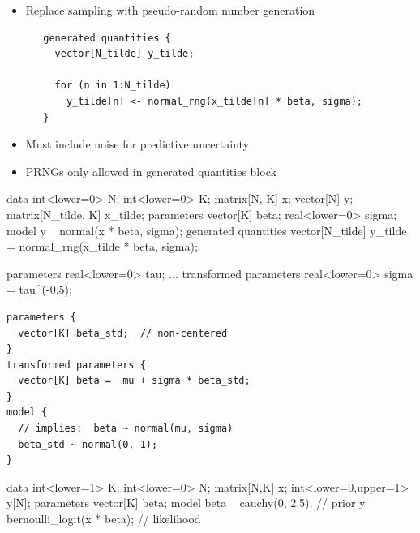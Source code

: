 \documentclass[10pt]{report}
\begin{document}
%
\begin{itemize}
\item Replace sampling with pseudo-random number generation
{\footnotesize
\begin{Verbatim}
   generated quantities {
     vector[N_tilde] y_tilde;

     for (n in 1:N_tilde) 
       y_tilde[n] <- normal_rng(x_tilde[n] * beta, sigma);
   }
\end{Verbatim}
}
\item Must include noise for predictive uncertainty
\item PRNGs only allowed in generated quantities block
\end{itemize}


%
\begin{stancode}
data {
  int<lower=0> N;               int<lower=0> K;
  matrix[N, K] x;               vector[N] y;
  matrix[N_tilde, K] x_tilde;
}
parameters {
  vector[K] beta;               real<lower=0> sigma;
}
model {
  y ~ normal(x * beta, sigma);
}
generated quantities {
  vector[N_tilde] y_tilde
    = normal_rng(x_tilde * beta, sigma);
}
\end{stancode}


%
\begin{stancode}
    parameters {
      real<lower=0> tau;
      ...
    }
    transformed parameters {
      real<lower=0> sigma = tau^(-0.5);
    }
\end{stancode}


{\small
\begin{Verbatim}
parameters {
  vector[K] beta_std;  // non-centered
}
transformed parameters {
  vector[K] beta =  mu + sigma * beta_std;
}
model {
  // implies:  beta ~ normal(mu, sigma)
  beta_std ~ normal(0, 1);
}
\end{Verbatim}
}


%
\begin{stancode}
     data {
       int<lower=1> K;
       int<lower=0> N;
       matrix[N,K] x;
       int<lower=0,upper=1> y[N];
     }
     parameters {
       vector[K] beta;
     }
     model {
        beta ~ cauchy(0, 2.5);          // prior
        y ~ bernoulli_logit(x * beta);  // likelihood
     }
\end{stancode}
\end{document}
